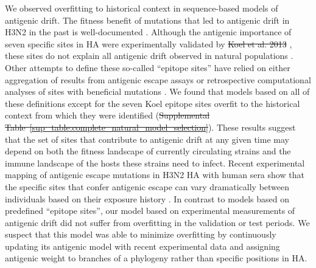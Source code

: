 \documentclass[9pt,lineno]{elife} %
\providecommand{\DIFadd}[1]{{\protect\color{blue}\uwave{#1}}} %
\providecommand{\DIFdel}[1]{{\protect\color{red}\sout{#1}}}                      %
\providecommand{\DIFaddbegin}{} %
\providecommand{\DIFaddend}{} %
\providecommand{\DIFdelbegin}{} %
\providecommand{\DIFdelend}{} %
\providecommand{\DIFaddtex}[1]{{\protect\color{blue}\uwave{#1}}} %
\providecommand{\DIFdeltex}[1]{{\protect\color{red}\sout{#1}}}                      %
\providecommand{\DIFaddbegin}{} %
\providecommand{\DIFaddend}{} %
\providecommand{\DIFdelbegin}{} %
\providecommand{\DIFdelend}{} %
\providecommand{\DIFadd}[1]{\texorpdfstring{\DIFaddtex{#1}}{#1}} %
\providecommand{\DIFdel}[1]{\texorpdfstring{\DIFdeltex{#1}}{}} %
\newcommand{\DIFscaledelfig}{0.5}
\newlength{\DIFdelgraphicswidth} %
\newlength{\DIFdelgraphicsheight} %
\newcommand{\DIFaddincludegraphics}[2][]{{\color{blue}\fbox{\DIFOincludegraphics[#1]{#2}}}} %
\newcommand{\DIFdelincludegraphics}[2][]{%
\sbox{\DIFdelgraphicsbox}{\DIFOincludegraphics[#1]{#2}}%
\settoboxwidth{\DIFdelgraphicswidth}{\DIFdelgraphicsbox} %
\settoboxtotalheight{\DIFdelgraphicsheight}{\DIFdelgraphicsbox} %
\scalebox{\DIFscaledelfig}{%
\parbox[b]{\DIFdelgraphicswidth}{\usebox{\DIFdelgraphicsbox}\\[-\baselineskip] \rule{\DIFdelgraphicswidth}{0em}}\llap{\resizebox{\DIFdelgraphicswidth}{\DIFdelgraphicsheight}{%
\setlength{\unitlength}{\DIFdelgraphicswidth}%
\begin{picture}(1,1)%
\thicklines\linethickness{2pt} %
{\color[rgb]{1,0,0}\put(0,0){\framebox(1,1){}}}%
{\color[rgb]{1,0,0}\put(0,0){\line( 1,1){1}}}%
{\color[rgb]{1,0,0}\put(0,1){\line(1,-1){1}}}%
\end{picture}%
}\hspace*{3pt}}} %
} %
\DeclareRobustCommand{\DIFaddbegin}{\DIFOaddbegin \let\includegraphics\DIFaddincludegraphics} %
\DeclareRobustCommand{\DIFaddend}{\DIFOaddend \let\includegraphics\DIFOincludegraphics} %
\DeclareRobustCommand{\DIFdelbegin}{\DIFOdelbegin \let\includegraphics\DIFdelincludegraphics} %
\DeclareRobustCommand{\DIFdelend}{\DIFOaddend \let\includegraphics\DIFOincludegraphics} %
\begin{document}
We observed overfitting to historical context in sequence-based models of antigenic drift.
The fitness benefit of mutations that led to antigenic drift in H3N2 in the past is well-documented \DIFdelbegin %
\DIFdelend \DIFaddbegin \citep{Wiley:1981bc,Smith:2004jc,Wolf:2006da,Koel:2013jz}\DIFaddend .
Although the antigenic importance of seven specific sites in HA were experimentally validated by \DIFdelbegin \DIFdel{Koel et al. 2013 }\DIFdelend \cite{Koel:2013jz}, these sites do not explain all antigenic drift observed in natural populations \DIFdelbegin %
\DIFdelend \DIFaddbegin \citep{Neher:2016hy}\DIFaddend .
Other attempts to define these so-called ``epitope sites'' have relied on either aggregation of results from antigenic escape assays \DIFdelbegin %
\DIFdelend \DIFaddbegin \citep{Wolf:2006da} \DIFaddend or retrospective computational analyses of sites with beneficial mutations \DIFdelbegin %
\DIFdelend \DIFaddbegin \citep{Shih:2007bd,Luksza:2014hj}\DIFaddend .
We found that models based on all of these definitions except for the seven Koel epitope sites overfit to the historical context from which they were identified (\DIFdelbegin \DIFdel{Supplemental Table~\ref{sup_table:complete_natural_model_selection}}\DIFdelend \DIFaddbegin \DIFadd{Table~\ref{table:complete_natural_model_selection}}\DIFaddend ).
These results suggest that the set of sites that contribute to antigenic drift at any given time may depend on both the fitness landscape of currently circulating strains and the immune landscape of the hosts these strains need to infect.
Recent experimental mapping of antigenic escape mutations in H3N2 HA with human sera show that the specific sites that confer antigenic escape can vary dramatically between individuals based on their exposure history \DIFdelbegin %
\DIFdelend \DIFaddbegin \citep{Lee2019}\DIFaddend .
In contrast to models based on predefined ``epitope sites'', our model based on experimental measurements of antigenic drift did not suffer from overfitting in the validation or test periods.
We suspect that this model was able to minimize overfitting by continuously updating its antigenic model with recent experimental data and assigning antigenic weight to branches of a phylogeny rather than specific positions in HA.
\end{document}
